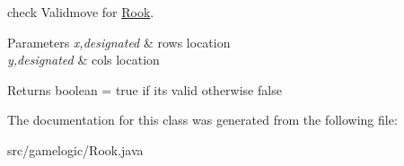 check Validmove for \mbox{\hyperlink{classgamelogic_1_1_rook}{Rook}}. 
\begin{DoxyParams}{Parameters}
{\em x,designated} & row\textquotesingle{}s location \\
\hline
{\em y,designated} & col\textquotesingle{}s location \\
\hline
\end{DoxyParams}
\begin{DoxyReturn}{Returns}
boolean = true if it\textquotesingle{}s valid otherwise false 
\end{DoxyReturn}


The documentation for this class was generated from the following file\+:\begin{DoxyCompactItemize}
\item 
src/gamelogic/Rook.\+java\end{DoxyCompactItemize}
